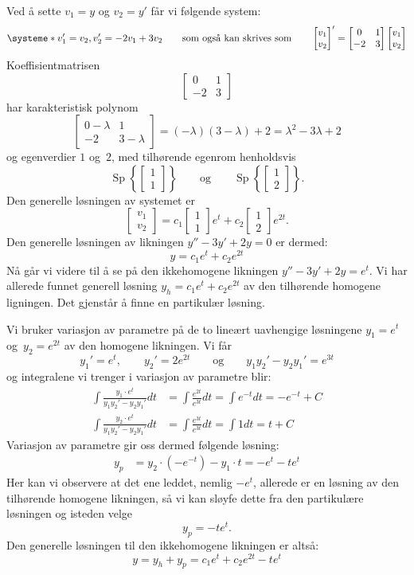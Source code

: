 \documentclass[notitlepage,a4paper,12pt,norsk]{IMFeksamen}
\DeclareMathOperator{\Sp}{Sp}
\newcommand{\vv}[2]{\begin{bmatrix} #1 \\ #2 \end{bmatrix}}
\newcommand{\0}{\V{0}}
\newcommand{\oppgslutt}{
\begin{center}
\pgfornament[width=6cm]{88}
\end{center}
}
\newenvironment{losning}{\begin{oppgave}}{\oppgslutt\end{oppgave}}
\begin{document}
\begin{losning}
Ved å sette $v_1 = y$ og $v_2 = y'$ får vi følgende system:
\[
\systeme*{
v_1' = v_2,
v_2' = -2v_1 + 3v_2
}
\qquad\text{som også kan skrives som}\qquad
\vv{v_1}{v_2}' =
\begin{bmatrix}
0 & 1 \\
-2 & 3
\end{bmatrix}
\vv{v_1}{v_2}
\]
Koeffisientmatrisen
\[
\begin{bmatrix}
0 & 1 \\
-2 & 3
\end{bmatrix}
\]
har karakteristisk polynom
\[
\begin{bmatrix}
0-\lambda & 1 \\
-2 & 3-\lambda
\end{bmatrix}
= (-\lambda)(3-\lambda) + 2
= \lambda^2 - 3\lambda + 2
\]
og egenverdier $1$ og~$2$, med tilhørende egenrom henholdsvis
\[
\Sp \left\{ \vv{1}{1} \right\}
\qquad\text{og}\qquad
\Sp \left\{ \vv{1}{2} \right\}.
\]
Den generelle løsningen av systemet er
\[
\vv{v_1}{v_2} = c_1 \vv{1}{1} e^t + c_2 \vv{1}{2} e^{2t}.
\]
Den generelle løsningen av likningen
$y'' - 3y' + 2y = 0$
er dermed:
\[
y = c_1 e^t + c_2 e^{2t}
\]
Nå går vi videre til å se på den ikkehomogene likningen 
$y'' - 3y' + 2y = e^t$.
Vi har allerede funnet generell løsning
$y_h = c_1 e^t + c_2 e^{2t}$
av den tilhørende homogene ligningen.
Det gjenstår å finne en partikulær løsning.

Vi bruker variasjon av parametre på de to lineært uavhengige løsningene
$y_1 = e^{t}$ og~$y_2 = e^{2t}$ av den homogene likningen.
Vi får
\[
y_1' = e^t,
\qquad
y_2' = 2 e^{2t}
\qquad
\text{og}\qquad
y_1 y_2' - y_2 y_1' = e^{3t}
\]
og integralene vi trenger i variasjon av parametre blir:
\begin{align*}
\int \frac{y_1 \cdot e^t}{y_1 y_2' - y_2 y_1'} dt
&= \int \frac{e^{2t}}{e^{3t}} dt
 = \int e^{-t} dt
 = - e^{-t} + C
\\
\int \frac{y_2 \cdot e^t}{y_1 y_2' - y_2 y_1'} dt
&= \int \frac{e^{3t}}{e^{3t}} dt
 = \int 1 dt
 = t + C
\end{align*}
Variasjon av parametre gir oss dermed følgende løsning:
\begin{align*}
y_p
&= y_2 \cdot (- e^{-t}) - y_1 \cdot t
 = -e^t - t e^t
\end{align*}
Her kan vi observere at det ene leddet, nemlig $-e^t$,
allerede er en løsning av den tilhørende homogene likningen,
så vi kan sløyfe dette fra den partikulære løsningen og isteden velge
\[
y_p = -t e^t.
\]
Den generelle løsningen til den ikkehomogene likningen er altså:
\[
y = y_h+y_p = c_1 e^t + c_2 e^{2t} - t e^t
\]
\end{losning}
\end{document}
